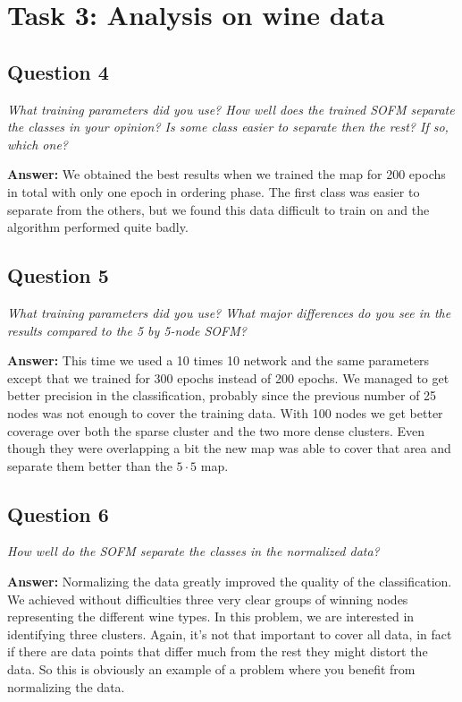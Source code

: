 \documentclass[a4paper]{article}
\begin{document}
\section*{Task 3: Analysis on wine data}

\subsection*{Question 4}
\emph{What training parameters did you use? How well does the trained
SOFM separate the classes in your opinion? Is some class easier to separate then the rest? If so, which one?}

\textbf{Answer:} We obtained the best results when we trained the map for 200 epochs in total with only one epoch in ordering phase. The first class was easier to separate from the others, but we found this data difficult to train on and the algorithm performed quite badly.

\subsection*{Question 5}
\emph{What training parameters did you use? What  major differences
do you see in the results compared to the 5 by 5-node SOFM?}

\textbf{Answer:} This time we used a 10 times 10 network and the same parameters except that we trained for 300 epochs instead of 200 epochs. We managed to get better precision in the classification, probably since the previous number of 25 nodes was not enough to cover the training data. With 100 nodes we get better coverage over both the sparse cluster and the two more dense clusters. Even though they were overlapping a bit the new map was able to cover that area and separate them better than the $5\cdot5$ map. 


\subsection*{Question 6}
\emph{How well do the SOFM separate the classes in the normalized
data?}

\textbf{Answer:} Normalizing the data greatly improved the quality of the classification. We achieved without difficulties three very clear groups of winning nodes representing the different wine types. In this problem, we are interested in identifying three clusters. Again, it's not that important to cover all data, in fact if there are data points that differ much from the rest they might distort the data. So this is obviously an example of a problem where you benefit from normalizing the data. 
\end{document}
